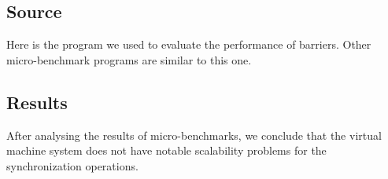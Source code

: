 \subsection{Source}
Here is the program we used to evaluate the performance of barriers. Other 
micro-benchmark programs are similar to this one.
\lstset{language=c}
\lstset{caption=Source code for the barrier micro-benchmark}
\lstset{captionpos=b}


\subsection{Results}
After analysing the results of micro-benchmarks, we conclude that the virtual
machine system does not have notable scalability problems for the
synchronization operations.

